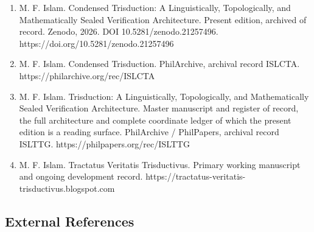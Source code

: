 \documentclass[10pt,twocolumn]{article}
\providecommand{\tightlist}{\setlength{\itemsep}{0pt}\setlength{\parskip}{0pt}}
\begin{document}
\begin{enumerate}
\def\labelenumi{\arabic{enumi}.}
\tightlist
\item
  M. F. Islam. Condensed Trisduction: A Linguistically, Topologically,
  and Mathematically Sealed Verification Architecture. Present edition,
  archived of record. Zenodo, 2026. DOI 10.5281/zenodo.21257496.
  https://doi.org/10.5281/zenodo.21257496
\item
  M. F. Islam. Condensed Trisduction. PhilArchive, archival record
  ISLCTA. https://philarchive.org/rec/ISLCTA
\item
  M. F. Islam. Trisduction: A Linguistically, Topologically, and
  Mathematically Sealed Verification Architecture. Master manuscript and
  register of record, the full architecture and complete coordinate
  ledger of which the present edition is a reading surface. PhilArchive
  / PhilPapers, archival record ISLTTG.
  https://philpapers.org/rec/ISLTTG
\item
  M. F. Islam. Tractatus Veritatis Trisductivus. Primary working
  manuscript and ongoing development record.
  https://tractatus-veritatis-trisductivus.blogspot.com
\end{enumerate}

\hypertarget{external-references}{%
\subsection{External References}\label{external-references}}
\end{document}
